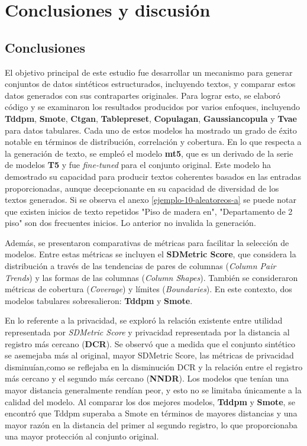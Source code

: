 \chapter{Conclusiones y discusión}

\section{Conclusiones}

El objetivo principal de este estudio fue desarrollar un mecanismo para generar conjuntos de datos sintéticos estructurados, incluyendo textos, y comparar estos datos generados con sus contrapartes originales. Para lograr esto, se elaboró código y se examinaron los resultados producidos por varios enfoques, incluyendo \textbf{Tddpm}, \textbf{Smote}, \textbf{Ctgan}, \textbf{Tablepreset}, \textbf{Copulagan}, \textbf{Gaussiancopula} y \textbf{Tvae} para datos tabulares. Cada uno de estos modelos ha mostrado un grado de éxito notable en términos de distribución, correlación y cobertura. En lo que respecta a la generación de texto, se empleó el modelo \textbf{mt5}, que es un derivado de la serie de modelos \textbf{T5} y fue \emph{fine-tuned} para el conjunto original. Este modelo ha demostrado su capacidad para producir textos coherentes basados en las entradas proporcionadas, aunque decepcionante en su capacidad de diversidad de los textos generados. Si se observa el anexo \ref{ejemplo-10-aleatoreos-a} se puede notar que existen inicios de texto repetidos "Piso de madera en", "Departamento de 2 piso" son dos frecuentes inicios. Lo anterior no invalida la generación.


Además, se presentaron comparativas de métricas para facilitar la selección de modelos. Entre estas métricas se incluyen el \textbf{SDMetric Score}, que considera la distribución a través de las tendencias de pares de columnas (\emph{Column Pair Trends}) y las formas de las columnas (\emph{Column Shapes}). También se consideraron métricas de cobertura (\emph{Coverage}) y límites (\emph{Boundaries}). En este contexto, dos modelos tabulares sobresalieron: \textbf{Tddpm} y \textbf{Smote}.

En lo referente a la privacidad, se exploró la relación existente entre utilidad representada por \emph{SDMetric Score} y privacidad representada por la distancia al registro más cercano (\textbf{DCR}). Se observó que a medida que el conjunto sintético se asemejaba más al original, mayor SDMetric Score, las métricas de privacidad disminuían,como se reflejaba en la disminución DCR y la relación entre el registro más cercano y el segundo más cercano (\textbf{NNDR}). Los modelos que tenían una mayor distancia generalmente rendían peor, y esto no se limitaba únicamente a la calidad del modelo. Al comparar los dos mejores modelos, \textbf{Tddpm} y \textbf{Smote}, se encontró que Tddpm superaba a Smote en términos de mayores distancias y una mayor razón en la distancia del primer al segundo registro, lo que proporcionaba una mayor protección al conjunto original.


